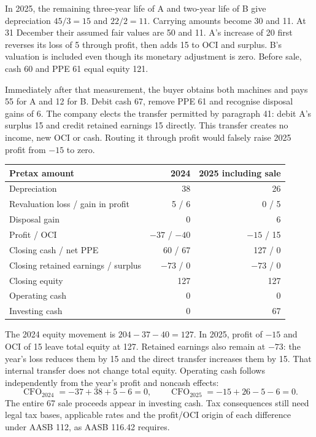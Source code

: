 In 2025, the remaining three-year life of A and two-year life of B give
depreciation $45/3=15$ and $22/2=11$. Carrying amounts become 30 and 11.
At 31 December their assumed fair values are 50 and 11. A's increase of
20 first reverses its loss of 5 through profit, then adds 15 to OCI and
surplus. B's valuation is included even though its monetary adjustment is
zero. Before sale, cash 60 and PPE 61 equal equity 121.

Immediately after that measurement, the buyer obtains both machines and pays
55 for A and 12 for B. Debit cash 67, remove PPE 61 and recognise disposal
gains of 6. The company elects the transfer permitted by paragraph 41:
debit A's surplus 15 and credit retained earnings 15 directly. This transfer
creates no income, new OCI or cash. Routing it through profit would falsely
raise 2025 profit from $-15$ to zero.

\begin{center}
\begin{tabular}{@{}lrr@{}}
\toprule
Pretax amount & 2024 & 2025 including sale\\
\midrule
Depreciation & 38 & 26\\
Revaluation loss / gain in profit & 5 / 6 & 0 / 5\\
Disposal gain & 0 & 6\\
Profit / OCI & $-37$ / $-40$ & $-15$ / 15\\
Closing cash / net PPE & 60 / 67 & 127 / 0\\
Closing retained earnings / surplus & $-73$ / 0 & $-73$ / 0\\
Closing equity & 127 & 127\\
Operating cash & 0 & 0\\
Investing cash & 0 & 67\\
\bottomrule
\end{tabular}
\end{center}

The 2024 equity movement is $204-37-40=127$. In 2025, profit of $-15$
and OCI of 15 leave total equity at 127. Retained earnings also remain at
$-73$: the year's loss reduces them by 15 and the direct transfer increases
them by 15. That internal transfer does not change total equity. Operating
cash follows independently from the year's profit and noncash effects:
\[
 \operatorname{CFO}_{2024}=-37+38+5-6=0,\qquad
 \operatorname{CFO}_{2025}=-15+26-5-6=0.
\]
The entire 67 sale proceeds appear in investing cash. Tax consequences still
need legal tax bases, applicable rates and the profit/OCI origin of each
difference under AASB 112, as AASB 116.42 requires.

